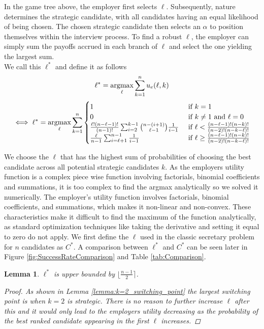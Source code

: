 \documentclass{article}
\newtheorem{lemma}{Lemma}
\newcommand{\argmax}{\operatornamewithlimits{argmax}} %
\begin{document}
In the game tree above, the employer first selects $\ell$. Subsequently, nature determines the strategic candidate, with all candidates having an equal likelihood of being chosen. The chosen strategic candidate then selects an $\alpha$ to position themselves within the interview process. To find a robust $\ell$, the employer can simply sum the payoffs accrued in each branch of $\ell$ and select the one yielding the largest sum.
\\[2ex]
We call this $\ell^*$ and define it as follows
$$ \ell^* = \argmax_{\ell} \sum_{k=1}^{n}u_e(\ell,k)$$
$$ \iff \ell^* = \argmax_{\ell} \sum_{k=1}^{n}
\begin{cases}
    1 & \text{ if } k = 1 \\
    0 & \text{ if } k \neq 1 \text{ and } \ell = 0 \\
    \frac{\ell!(n-\ell-1)!}{(n-1)!}\sum_{i = 2}^{k-1}\binom{n-(i+1)}{\ell-1}\frac{1}{i-1} & \text{ if } \ell < \frac{(n-\ell-1)!(n-k)!}{(n-2)!(n-k-\ell)!} \\
    \frac{\ell}{n-1}\sum_{i = \ell + 1}^{n-1}\frac{1}{i-1} & \text{ if } \ell \geq \frac{(n-\ell-1)!(n-k)!}{(n-2)!(n-k-\ell)!}
\end{cases}
$$

We choose the $\ell$ that has the highest sum of probabilities of choosing the best candidate across all potential strategic candidates $k$. As the employers utility function is a complex piece wise function involving factorials, binomial coefficients and summations, it is too complex to find the argmax analytically so we solved it numerically. The employer's utility function involves factorials, binomial coefficients, and summations, which makes it non-linear and non-convex. These characteristics make it difficult to find the maximum of the function analytically, as standard optimization techniques like taking the derivative and setting it equal to zero do not apply. We first define the $\ell$ used in the classic secretary problem for $n$ candidates as $C^*$. A comparison between $\ell^*$ and $C^*$ can be seen later in Figure \ref{fig:SuccessRateComparison} and Table \ref{tab:Comparison}. 

\begin{lemma}\label{lemma:l*_upper_bound}
    $\ell^*$ is upper bounded by $\lfloor \frac{n-1}{2} \rceil$.
    \begin{proof}
        As shown in Lemma \ref{lemma:k=2_switching_point} the largest switching point is when $k=2$ is strategic. There is no reason to further increase $\ell$ after this and it would only lead to the employers utility decreasing as the probability of the best ranked candidate appearing in the first $\ell$ increases.
    \end{proof}
\end{lemma}
\end{document}
